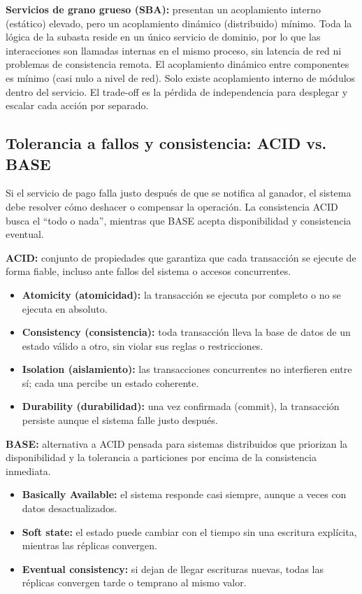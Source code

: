 \documentclass[12pt, a4paper]{article}
\begin{document}
    \textbf{Servicios de grano grueso (SBA):} presentan un acoplamiento interno (estático) elevado, pero un acoplamiento dinámico (distribuido) mínimo. Toda la lógica de la subasta reside en un único servicio de dominio, por lo que las interacciones son llamadas internas en el mismo proceso, sin latencia de red ni problemas de consistencia remota. El acoplamiento dinámico entre componentes es mínimo (casi nulo a nivel de red). Solo existe acoplamiento interno de módulos dentro del servicio. El trade-off es la pérdida de independencia para desplegar y escalar cada acción por separado.

    \subsection{Tolerancia a fallos y consistencia: ACID vs. BASE}

    Si el servicio de pago falla justo después de que se notifica al ganador, el sistema debe resolver cómo deshacer o compensar la operación. La consistencia ACID busca el “todo o nada”, mientras que BASE acepta disponibilidad y consistencia eventual.

    \textbf{ACID:} conjunto de propiedades que garantiza que cada transacción se ejecute de forma fiable, incluso ante fallos del sistema o accesos concurrentes.

    \begin{itemize}
        \item \textbf{Atomicity (atomicidad):} la transacción se ejecuta por completo o no se ejecuta en absoluto.
        \item \textbf{Consistency (consistencia):} toda transacción lleva la base de datos de un estado válido a otro, sin violar sus reglas o restricciones.
        \item \textbf{Isolation (aislamiento):} las transacciones concurrentes no interfieren entre sí; cada una percibe un estado coherente.
        \item \textbf{Durability (durabilidad):} una vez confirmada (commit), la transacción persiste aunque el sistema falle justo después.
    \end{itemize}

    \textbf{BASE:} alternativa a ACID pensada para sistemas distribuidos que priorizan la disponibilidad y la tolerancia a particiones por encima de la consistencia inmediata.

    \begin{itemize}
        \item \textbf{Basically Available:} el sistema responde casi siempre, aunque a veces con datos desactualizados.
        \item \textbf{Soft state:} el estado puede cambiar con el tiempo sin una escritura explícita, mientras las réplicas convergen.
        \item \textbf{Eventual consistency:} si dejan de llegar escrituras nuevas, todas las réplicas convergen tarde o temprano al mismo valor.
    \end{itemize}
\end{document}
